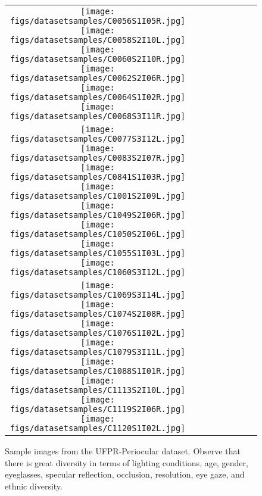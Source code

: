 \documentclass[journal]{IEEEtran}
\begin{document}
\begin{figure}[!ht]
\begin{tabular}{cccccccc}
    {\texttt{[image: figs/datasetsamples/C0056S1I05R.jpg]}}
    {\texttt{[image: figs/datasetsamples/C0058S2I10L.jpg]}}
    {\texttt{[image: figs/datasetsamples/C0060S2I10R.jpg]}}
    {\texttt{[image: figs/datasetsamples/C0062S2I06R.jpg]}}
    {\texttt{[image: figs/datasetsamples/C0064S1I02R.jpg]}}
    {\texttt{[image: figs/datasetsamples/C0068S3I11R.jpg]}} 
    \\
    \hspace{-2.7mm}
	{\texttt{[image: figs/datasetsamples/C0077S3I12L.jpg]}}
	{\texttt{[image: figs/datasetsamples/C0083S2I07R.jpg]}}
    {\texttt{[image: figs/datasetsamples/C0841S1I03R.jpg]}}
    {\texttt{[image: figs/datasetsamples/C1001S2I09L.jpg]}}
    {\texttt{[image: figs/datasetsamples/C1049S2I06R.jpg]}}
    {\texttt{[image: figs/datasetsamples/C1050S2I06L.jpg]}}
    {\texttt{[image: figs/datasetsamples/C1055S1I03L.jpg]}}
    {\texttt{[image: figs/datasetsamples/C1060S3I12L.jpg]}} 
    \\
	\hspace{-2.7mm} {\texttt{[image: figs/datasetsamples/C1069S3I14L.jpg]}}
	{\texttt{[image: figs/datasetsamples/C1074S2I08R.jpg]}}
    {\texttt{[image: figs/datasetsamples/C1076S1I02L.jpg]}}
    {\texttt{[image: figs/datasetsamples/C1079S3I11L.jpg]}}
    {\texttt{[image: figs/datasetsamples/C1088S1I01R.jpg]}}
    {\texttt{[image: figs/datasetsamples/C1113S2I10L.jpg]}}
    {\texttt{[image: figs/datasetsamples/C1119S2I06R.jpg]}}
    {\texttt{[image: figs/datasetsamples/C1120S1I02L.jpg]}} 
\end{tabular}

\vspace{-0.25mm}

\caption{Sample images from the UFPR-Periocular dataset. Observe that there is great diversity in terms of lighting conditions, age, gender, eyeglasses, specular reflection, occlusion, resolution, eye gaze, and ethnic diversity.}
\label{fig:datasetsamples}
\end{figure}
\end{document}
